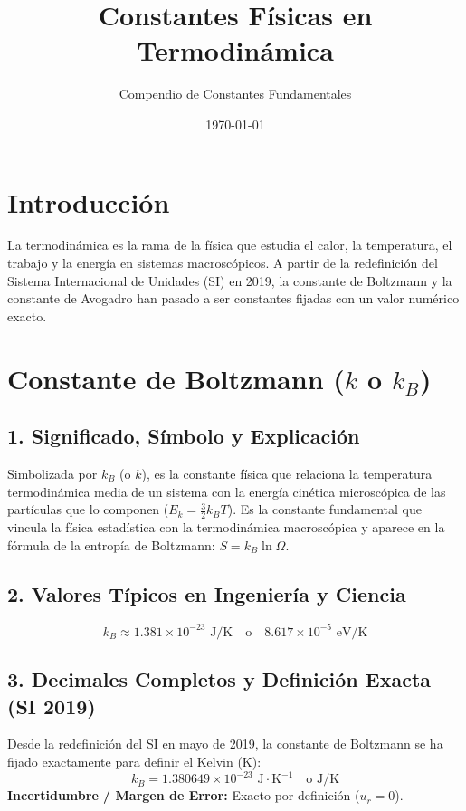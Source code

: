 \documentclass[12pt,a4paper]{article}
\title{\textbf{Constantes Físicas en Termodinámica}}
\author{Compendio de Constantes Fundamentales}
\date{\today}
\begin{document}
\maketitle

\section*{Introducción}
La termodinámica es la rama de la física que estudia el calor, la temperatura, el trabajo y la energía en sistemas macroscópicos. A partir de la redefinición del Sistema Internacional de Unidades (SI) en 2019, la constante de Boltzmann y la constante de Avogadro han pasado a ser constantes fijadas con un valor numérico exacto.

\section{Constante de Boltzmann ($k$ o $k_B$)}

\subsection*{1. Significado, Símbolo y Explicación}
Simbolizada por $k_B$ (o $k$), es la constante física que relaciona la temperatura termodinámica media de un sistema con la energía cinética microscópica de las partículas que lo componen ($E_k = \frac{3}{2} k_B T$). Es la constante fundamental que vincula la física estadística con la termodinámica macroscópica y aparece en la fórmula de la entropía de Boltzmann: $S = k_B \ln \Omega$.

\subsection*{2. Valores Típicos en Ingeniería y Ciencia}
\begin{equation*}
k_B \approx 1.381 \times 10^{-23} \text{ J/K} \quad \text{o} \quad 8.617 \times 10^{-5} \text{ eV/K}
\end{equation*}

\subsection*{3. Decimales Completos y Definición Exacta (SI 2019)}
Desde la redefinición del SI en mayo de 2019, la constante de Boltzmann se ha fijado exactamente para definir el Kelvin (K):
\begin{equation*}
k_B = 1.380649 \times 10^{-23} \text{ J}\cdot\text{K}^{-1} \quad \text{o} \text{ J/K}
\end{equation*}
\textbf{Incertidumbre / Margen de Error:} Exacto por definición ($u_r = 0$).
\end{document}
